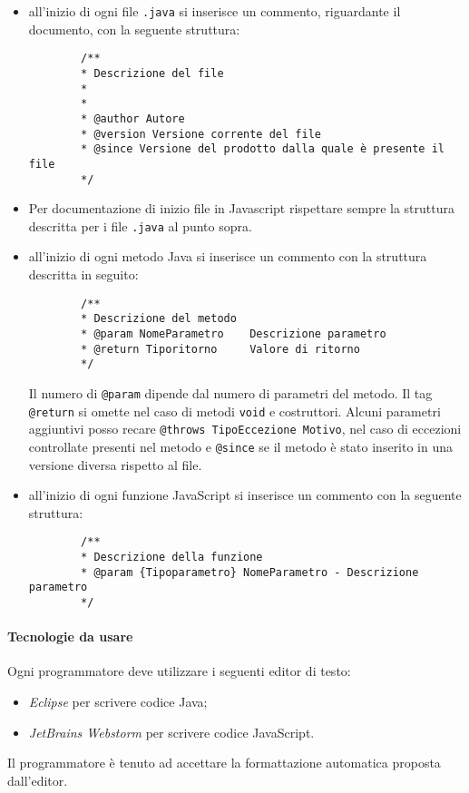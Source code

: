 	\begin{itemize}
		\item all'inizio di ogni file \texttt{.java} si inserisce un commento, riguardante il documento, con la seguente struttura:
		\begin{verbatim}
		/**
		* Descrizione del file
		*
		*
		* @author Autore
		* @version Versione corrente del file
		* @since Versione del prodotto dalla quale è presente il file
		*/
		\end{verbatim}
		\item Per documentazione di inizio file in Javascript rispettare sempre la struttura descritta per i file \texttt{.java} al punto sopra.
		\item all'inizio di ogni metodo Java si inserisce un commento con la struttura descritta in seguito:
		\begin{verbatim}
		/** 
		* Descrizione del metodo
		* @param NomeParametro    Descrizione parametro
		* @return Tiporitorno     Valore di ritorno 
		*/
		\end{verbatim}
		Il numero di \texttt{@param} dipende dal numero di parametri del metodo. Il tag \texttt{@return} si omette nel caso di metodi \texttt{void} e costruttori. Alcuni parametri aggiuntivi posso recare \texttt{@throws TipoEccezione Motivo}, nel caso di eccezioni controllate presenti nel metodo e \texttt{@since} se il metodo è stato inserito in una versione diversa rispetto al file.
		\item all'inizio di ogni funzione JavaScript si inserisce un commento con la seguente struttura:
		\begin{verbatim}
		/** 
		* Descrizione della funzione
		* @param {Tipoparametro} NomeParametro - Descrizione parametro
		*/
		\end{verbatim}
	\end{itemize}
	
	\paragraph{Tecnologie da usare}
	Ogni programmatore deve utilizzare i seguenti editor di testo:
	\begin{itemize}
		\item \emph{Eclipse} per scrivere codice Java;
		\item \emph{JetBrains Webstorm} per scrivere codice JavaScript.
	\end{itemize}
	Il programmatore è tenuto ad accettare la formattazione automatica proposta dall'editor.

